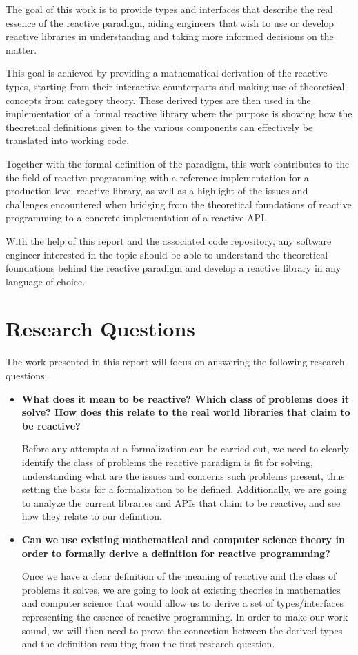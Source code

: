 The goal of this work is to provide types and interfaces that describe the real essence of the reactive paradigm, aiding engineers that wish to use or develop reactive libraries in understanding and taking more informed decisions on the matter.

This goal is achieved by providing a mathematical derivation of the reactive types, starting from their interactive counterparts and making use of theoretical concepts from category theory. These derived types are then used in the implementation of a formal reactive library where the purpose is showing how the theoretical definitions given to the various components can effectively be translated into working code. 

Together with the formal definition of the paradigm, this work contributes to the the field of reactive programming with a reference implementation for a production level reactive library, as well as a highlight of the issues and challenges encountered when bridging from the theoretical foundations of reactive programming to a concrete implementation of a reactive API. 

With the help of this report and the associated code repository, any software engineer interested in the topic should be able to understand the theoretical foundations behind the reactive paradigm and develop a reactive library in any language of choice.

\section*{Research Questions}

The work presented in this report will focus on answering the following research questions:

\begin{itemize}
\item \textbf{What does it mean to be reactive? Which class of problems does it solve? How does this relate to the real world libraries that claim to be reactive?}

Before any attempts at a formalization can be carried out, we need to clearly identify the class of problems the reactive paradigm is fit for solving, understanding what are the issues and concerns such problems present, thus setting the basis for a formalization to be defined. Additionally, we are going to analyze the current libraries and APIs that claim to be reactive, and see how they relate to our definition.

\item \textbf{Can we use existing mathematical and computer science theory in order to formally derive a definition for reactive programming?}

Once we have a clear definition of the meaning of reactive and the class of problems it solves, we are going to look at existing theories in mathematics and computer science that would allow us to derive a set of types/interfaces representing the essence of reactive programming. In order to make our work sound, we will then need to prove the connection between the derived types and the definition resulting from the first research question.
\end{itemize}

